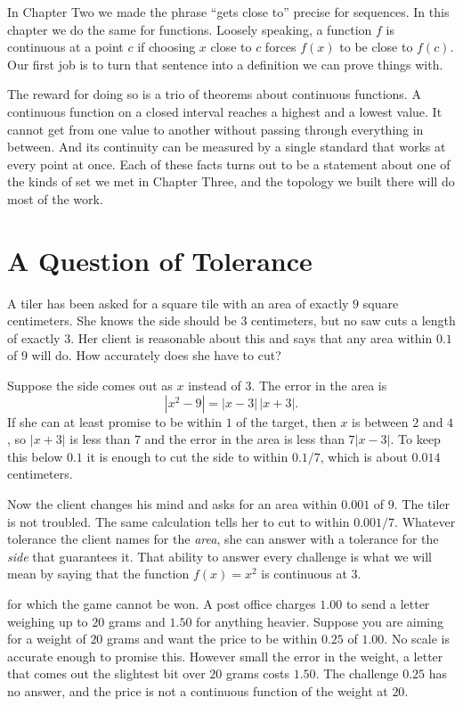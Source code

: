 
In Chapter Two we made the phrase ``gets close to'' precise for sequences.  In this chapter we do the same for functions.  Loosely speaking, a function $f$ is continuous at a point $c$ if choosing $x$ close to $c$ forces $f(x)$ to be close to $f(c)$.  Our first job is to turn that sentence into a definition we can prove things with.

The reward for doing so is a trio of theorems about continuous functions.  A continuous function on a closed interval reaches a highest and a lowest value.  It cannot get from one value to another without passing through everything in between.  And its continuity can be measured by a single standard that works at every point at once.  Each of these facts turns out to be a statement about one of the kinds of set we met in Chapter Three, and the topology we built there will do most of the work.

\section{A Question of Tolerance}\label{sec:tolerance}

A tiler has been asked for a square tile with an area of exactly $9$ square centimeters.  She knows the side should be $3$ centimeters, but no saw cuts a length of exactly $3$.  Her client is reasonable about this and says that any area within $0.1$ of $9$ will do.  How accurately does she have to cut?

Suppose the side comes out as $x$ instead of $3$.  The error in the area is
\[ |x^2 - 9| = |x - 3|\,|x + 3|. \]
If she can at least promise to be within $1$ of the target, then $x$ is between $2$ and $4$, so $|x + 3|$ is less than $7$ and the error in the area is less than $7|x - 3|$.  To keep this below $0.1$ it is enough to cut the side to within $0.1/7$, which is about $0.014$ centimeters.

Now the client changes his mind and asks for an area within $0.001$ of $9$.  The tiler is not troubled.  The same calculation tells her to cut to within $0.001/7$.  Whatever tolerance the client names for the \emph{area}, she can answer with a tolerance for the \emph{side} that guarantees it.  That ability to answer every challenge is what we will mean by saying that the function $f(x) = x^2$ is continuous at $3$.

 for which the game cannot be won.  A post office charges $1.00$ to send a letter weighing up to $20$ grams and $1.50$ for anything heavier.  Suppose you are aiming for a weight of $20$ grams and want the price to be within $0.25$ of $1.00$.  No scale is accurate enough to promise this.  However small the error in the weight, a letter that comes out the slightest bit over $20$ grams costs $1.50$.  The challenge $0.25$ has no answer, and the price is not a continuous function of the weight at $20$.

